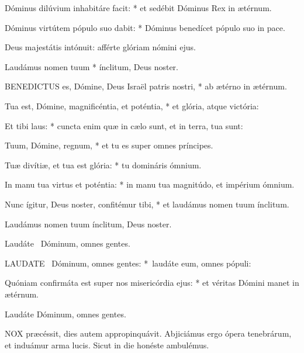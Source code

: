 Dóminus dilúvium inhabitáre facit: * et sedébit Dóminus Rex in ætérnum.

Dóminus virtútem pópulo suo dabit: * Dóminus benedícet pópulo suo in pace.

 Deus majestátis intónuit: afférte glóriam nómini ejus.

 Laudámus nomen tuum * ínclitum, Deus noster.


\lettrine[lines=2]{B}{ENEDICTUS} es, Dómine, Deus Israël patris nostri, * ab ætérno in ætérnum.

Tua est, Dómine, magnificéntia, et poténtia, * et glória, atque victória:

Et tibi laus: * cuncta enim quæ in cælo sunt, et in terra, tua sunt:

Tuum, Dómine, regnum, * et tu es super omnes príncipes.

Tuæ divítiæ, et tua est glória: * tu domináris ómnium.

In manu tua virtus et poténtia: * in manu tua magnitúdo, et impérium ómnium.

Nunc ígitur, Deus noster, confitémur tibi, * et laudámus nomen tuum ínclitum.

 Laudámus nomen tuum ínclitum, Deus noster.

 Laudáte \textdagger\ Dóminum, omnes gentes. \textdaggerdbl


\lettrine[lines=2]{L}{AUDATE} \textdagger\ Dóminum, omnes gentes: *\textdaggerdbl\ laudáte eum, omnes pópuli:

Quóniam confirmáta est super nos misericórdia ejus: * et véritas Dómini manet in ætérnum.

 Laudáte Dóminum, omnes gentes.




\lettrine[lines=2]{N}{OX} præcéssit, dies autem appropinquávit. Abjiciámus ergo ópera tenebrárum, et induámur arma lucis. Sicut in die honéste ambulémus.

